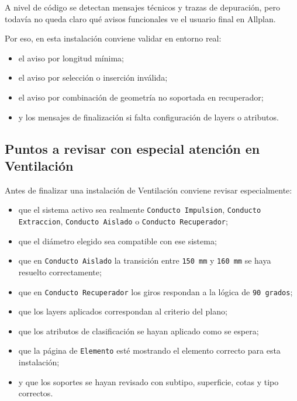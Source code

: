 A nivel de código se detectan mensajes técnicos y trazas de depuración, pero todavía no queda claro qué avisos funcionales ve el usuario final en Allplan.

Por eso, en esta instalación conviene validar en entorno real:

\begin{itemize}
\item el aviso por longitud mínima;
\item el aviso por selección o inserción inválida;
\item el aviso por combinación de geometría no soportada en recuperador;
\item y los mensajes de finalización si falta configuración de layers o atributos.
\end{itemize}

\subsection{Puntos a revisar con especial atención en Ventilación}

Antes de finalizar una instalación de Ventilación conviene revisar especialmente:

\begin{itemize}
\item que el sistema activo sea realmente \texttt{Conducto Impulsion}, \texttt{Conducto Extraccion}, \texttt{Conducto Aislado} o \texttt{Conducto Recuperador};
\item que el diámetro elegido sea compatible con ese sistema;
\item que en \texttt{Conducto Aislado} la transición entre \texttt{150 mm} y \texttt{160 mm} se haya resuelto correctamente;
\item que en \texttt{Conducto Recuperador} los giros respondan a la lógica de \texttt{90 grados};
\item que los layers aplicados correspondan al criterio del plano;
\item que los atributos de clasificación se hayan aplicado como se espera;
\item que la página de \texttt{Elemento} esté mostrando el elemento correcto para esta instalación;
\item y que los soportes se hayan revisado con subtipo, superficie, cotas y tipo correctos.
\end{itemize}

